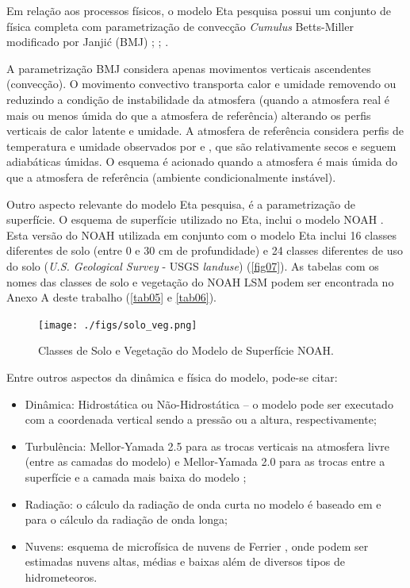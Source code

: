 Em relação aos processos físicos, o modelo Eta pesquisa possui um conjunto de física completa com parametrização de convecção \textit{Cumulus} Betts-Miller modificado por Janjić (BMJ) \cite{betts86}; \cite{bettsmiller86}; \cite{janjic94}.

A parametrização BMJ considera apenas movimentos verticais ascendentes (convecção). O movimento convectivo transporta calor e umidade removendo ou reduzindo a condição de instabilidade da atmosfera (quando a atmosfera real é mais ou menos úmida do que a atmosfera de referência) alterando os perfis verticais de calor latente e umidade. A atmosfera de referência considera perfis de temperatura e umidade observados por  e , que são relativamente secos e seguem adiabáticas úmidas. O esquema é acionado quando a atmosfera é mais úmida do que a atmosfera de referência (ambiente condicionalmente instável).

Outro aspecto relevante do modelo Eta pesquisa, é a parametrização de superfície. O esquema de superfície utilizado no Eta, inclui o modelo NOAH \cite{mitchelletal01}. Esta versão do NOAH utilizada em conjunto com o modelo Eta  inclui 16 classes diferentes de solo (entre 0 e 30 cm de profundidade) e 24 classes diferentes de uso do solo (\textit{U.S. Geological Survey} - USGS \textit{landuse}) (\autoref{fig07}). As tabelas com os nomes das classes de solo e vegetação do NOAH LSM podem ser encontrada no Anexo A deste trabalho (\autoref{tab05} e \autoref{tab06}).

\begin{figure}[!h]
\centering
\texttt{[image: ./figs/solo\_veg.png]}
\caption{Classes de Solo e Vegetação do Modelo de Superfície NOAH.}
\label{fig07}
\end{figure}

Entre outros aspectos da dinâmica e física do modelo, pode-se citar:
 
\begin{itemize}
\item Dinâmica: Hidrostática ou Não-Hidrostática – o modelo pode ser executado com a coordenada vertical sendo a pressão ou a altura, respectivamente;
\item Turbulência: Mellor-Yamada 2.5 para as trocas verticais na atmosfera livre (entre as camadas do modelo) e Mellor-Yamada 2.0 para as trocas entre a superfície e a camada mais baixa do modelo \cite{melloryamada74};
\item Radiação: o cálculo da radiação de onda curta no modelo é baseado em  e  para o cálculo da radiação de onda longa;
\item Nuvens: esquema de microfísica de nuvens de Ferrier \cite{ferrieretal02}, onde podem ser estimadas nuvens altas, médias e baixas além de diversos tipos de hidrometeoros.
\end{itemize}

